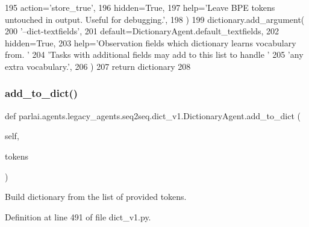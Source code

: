 \begin{DoxyCode}
195             action=\textcolor{stringliteral}{'store\_true'},
196             hidden=\textcolor{keyword}{True},
197             help=\textcolor{stringliteral}{'Leave BPE tokens untouched in output. Useful for debugging.'},
198         )
199         dictionary.add\_argument(
200             \textcolor{stringliteral}{'--dict-textfields'},
201             default=DictionaryAgent.default\_textfields,
202             hidden=\textcolor{keyword}{True},
203             help=\textcolor{stringliteral}{'Observation fields which dictionary learns vocabulary from. '}
204             \textcolor{stringliteral}{'Tasks with additional fields may add to this list to handle '}
205             \textcolor{stringliteral}{'any extra vocabulary.'},
206         )
207         \textcolor{keywordflow}{return} dictionary
208 
\end{DoxyCode}
\mbox{\label{classparlai_1_1agents_1_1legacy__agents_1_1seq2seq_1_1dict__v1_1_1DictionaryAgent_a684aef1570f33b66b7513119359006c2}} 
\subsubsection{\texorpdfstring{add\+\_\+to\+\_\+dict()}{add\_to\_dict()}}
{\footnotesize\ttfamily def parlai.\+agents.\+legacy\+\_\+agents.\+seq2seq.\+dict\+\_\+v1.\+Dictionary\+Agent.\+add\+\_\+to\+\_\+dict (\begin{DoxyParamCaption}\item[{}]{self,  }\item[{}]{tokens }\end{DoxyParamCaption})}

\begin{DoxyVerb}Build dictionary from the list of provided tokens.
\end{DoxyVerb}
 

Definition at line 491 of file dict\+\_\+v1.\+py.


